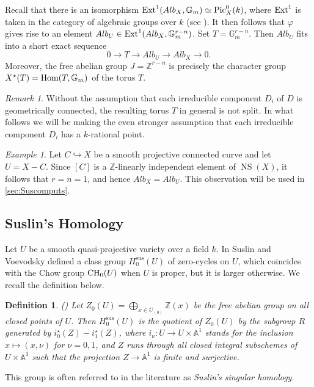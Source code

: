 \documentclass[12pt]{amsart}
\newtheorem{defn}[defn]{Definition}
\theoremstyle{remark}
\newtheorem{rem}[rem]{Remark}
\newtheorem{exm}[thm]{Example}
\newcommand{\A}{{\mathbb A}}
\newcommand{\G}{{\mathbb G}}
\newcommand{\Z}{{\mathbb Z}}
\renewcommand{\1}{{\mathbb{S}}}
\newcommand{\CH}{{\rm CH}}
\newcommand{\Pic}{{\rm Pic}}
\newcommand{\Ext}{{\rm Ext}}
\newcommand{\Hom}{{\rm Hom}}
\newcommand{\NS}{{\operatorname{NS}}}
\newcommand{\<}{\langle}
\renewcommand{\>}{\rangle}
\newcommand{\Sus}{{\operatorname{sus}}}
\begin{document}
Recall that there is an isomorphism $\Ext^1(Alb_X, \G_m)\simeq\Pic_X^0(k)$, where $\Ext^1$ is taken in the category of algebraic groups over $k$ (see \cite[I.3, Lemma 3.1]{Mil06}). It then follows that $\varphi$ gives rise to an element $Alb_U\in\Ext^1(Alb_X,\G_m^{r-n})$. Set $T=\G_m^{r-n}$. Then $Alb_U$ fits into a short exact sequence 
\[0\to T\to Alb_U\to Alb_X\to 0.\]
Moreover, the free abelian group $J=\Z^{r-n}$ is precisely the character group $X^\star(T)=\Hom(T,\G_m)$ of the torus $T$. 
\begin{rem}
Without the assumption that each irreducible component $D_i$ of $D$ is geometrically connected, the resulting torus $T$  in general is not split. In what follows we will be making the even stronger assumption that each irreducible component $D_i$ has a $k$-rational point.     
\end{rem}




\begin{exm}\label{onecomponent} 
    Let $C\hookrightarrow X$ be a smooth projective connected curve and let $U=X-C$. Since $[C]$ is a $\Z$-linearly independent element of $\NS(X)$, it follows that $r=n=1$, and hence $Alb_X=Alb_U$.  This observation will be used in \autoref{sec:Suscomputs}. 
\end{exm}
	

\subsection{Suslin's Homology}\label{sec:Suslin} Let $U$ be a smooth quasi-projective variety over a field $k$. In \cite{Sus} Suslin and Voevodsky defined a class group $H_0^{\Sus}(U)$ of zero-cycles on $U$, which  coincides with the Chow group $\CH_0(U)$ when $U$ is proper, but it is larger otherwise. We recall the definition below. 
\begin{defn} (\cite{Sus})
Let $\displaystyle Z_0(U)=\bigoplus_{x\in U_{(0)}}\Z(x)$ be the free abelian group on all closed points of $U$. Then $H_0^{\Sus}(U)$ is the quotient of $Z_0(U)$ by the subgroup $R$ generated by $i_0^\star(Z)-i_1^\star(Z)$, where $i_\nu:U\to U\times \A^1$ stands for the inclusion $x\mapsto (x,\nu)$ for $\nu=0,1$, and $Z$ runs through all closed integral subschemes of $U\times\A^1$ such that the projection $Z\to\A^1$ is finite and surjective. 
\end{defn} This group is often referred to in the literature as \textit{Suslin's singular homology}. 
\end{document}
